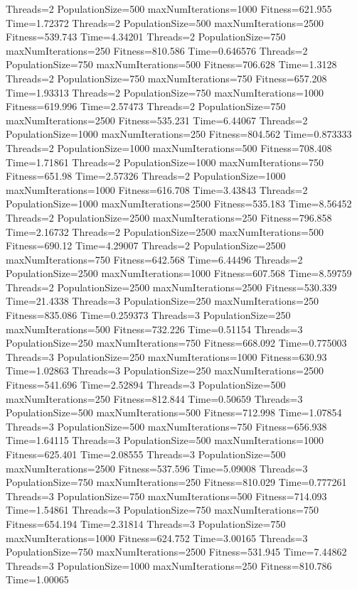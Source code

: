 \documentclass[10pt,letterpaper]{article}
\begin{document}
Threads=2 PopulationSize=500 maxNumIterations=1000 Fitness=621.955 Time=1.72372
Threads=2 PopulationSize=500 maxNumIterations=2500 Fitness=539.743 Time=4.34201
Threads=2 PopulationSize=750 maxNumIterations=250 Fitness=810.586 Time=0.646576
Threads=2 PopulationSize=750 maxNumIterations=500 Fitness=706.628 Time=1.3128
Threads=2 PopulationSize=750 maxNumIterations=750 Fitness=657.208 Time=1.93313
Threads=2 PopulationSize=750 maxNumIterations=1000 Fitness=619.996 Time=2.57473
Threads=2 PopulationSize=750 maxNumIterations=2500 Fitness=535.231 Time=6.44067
Threads=2 PopulationSize=1000 maxNumIterations=250 Fitness=804.562 Time=0.873333
Threads=2 PopulationSize=1000 maxNumIterations=500 Fitness=708.408 Time=1.71861
Threads=2 PopulationSize=1000 maxNumIterations=750 Fitness=651.98 Time=2.57326
Threads=2 PopulationSize=1000 maxNumIterations=1000 Fitness=616.708 Time=3.43843
Threads=2 PopulationSize=1000 maxNumIterations=2500 Fitness=535.183 Time=8.56452
Threads=2 PopulationSize=2500 maxNumIterations=250 Fitness=796.858 Time=2.16732
Threads=2 PopulationSize=2500 maxNumIterations=500 Fitness=690.12 Time=4.29007
Threads=2 PopulationSize=2500 maxNumIterations=750 Fitness=642.568 Time=6.44496
Threads=2 PopulationSize=2500 maxNumIterations=1000 Fitness=607.568 Time=8.59759
Threads=2 PopulationSize=2500 maxNumIterations=2500 Fitness=530.339 Time=21.4338
Threads=3 PopulationSize=250 maxNumIterations=250 Fitness=835.086 Time=0.259373
Threads=3 PopulationSize=250 maxNumIterations=500 Fitness=732.226 Time=0.51154
Threads=3 PopulationSize=250 maxNumIterations=750 Fitness=668.092 Time=0.775003
Threads=3 PopulationSize=250 maxNumIterations=1000 Fitness=630.93 Time=1.02863
Threads=3 PopulationSize=250 maxNumIterations=2500 Fitness=541.696 Time=2.52894
Threads=3 PopulationSize=500 maxNumIterations=250 Fitness=812.844 Time=0.50659
Threads=3 PopulationSize=500 maxNumIterations=500 Fitness=712.998 Time=1.07854
Threads=3 PopulationSize=500 maxNumIterations=750 Fitness=656.938 Time=1.64115
Threads=3 PopulationSize=500 maxNumIterations=1000 Fitness=625.401 Time=2.08555
Threads=3 PopulationSize=500 maxNumIterations=2500 Fitness=537.596 Time=5.09008
Threads=3 PopulationSize=750 maxNumIterations=250 Fitness=810.029 Time=0.777261
Threads=3 PopulationSize=750 maxNumIterations=500 Fitness=714.093 Time=1.54861
Threads=3 PopulationSize=750 maxNumIterations=750 Fitness=654.194 Time=2.31814
Threads=3 PopulationSize=750 maxNumIterations=1000 Fitness=624.752 Time=3.00165
Threads=3 PopulationSize=750 maxNumIterations=2500 Fitness=531.945 Time=7.44862
Threads=3 PopulationSize=1000 maxNumIterations=250 Fitness=810.786 Time=1.00065
\end{document}
